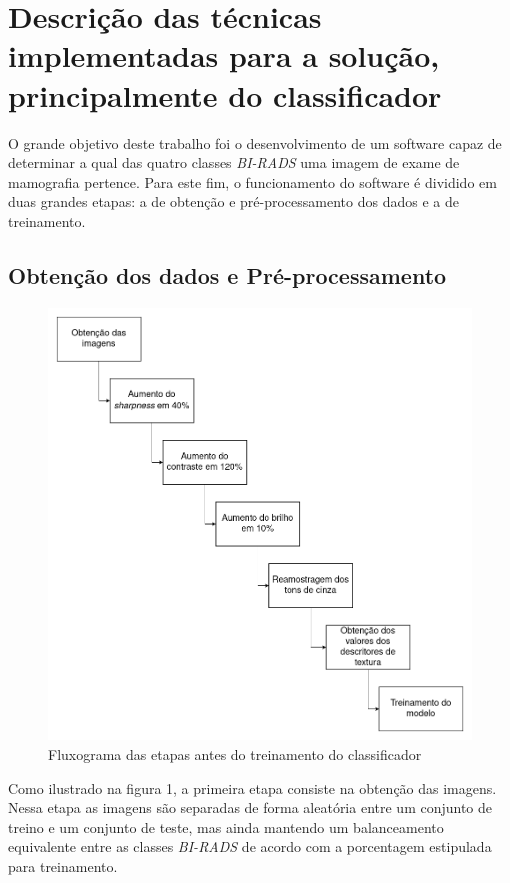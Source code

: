 \section{Descrição das técnicas implementadas para a solução, principalmente do classificador}

O grande objetivo deste trabalho foi o desenvolvimento de um software capaz de 
determinar a qual das quatro classes \emph{BI-RADS} uma imagem de exame de mamografia 
pertence. Para este fim, o funcionamento do software é dividido em duas grandes 
etapas: a de obtenção e pré-processamento dos dados e a de treinamento.

\newpage
\subsection{Obtenção dos dados e Pré-processamento}

\begin{figure}
    \centering
    \includegraphics[scale=0.3]{Imagens/Fluxograma.png}
    \caption{Fluxograma das etapas antes do treinamento do classificador}
\end{figure}

Como ilustrado na figura 1, a primeira etapa consiste na obtenção das imagens.
Nessa etapa as imagens são separadas de forma aleatória entre um conjunto de 
treino e um conjunto de teste, mas ainda mantendo um balanceamento equivalente 
entre as classes \emph{BI-RADS} de acordo com a porcentagem estipulada para treinamento.

